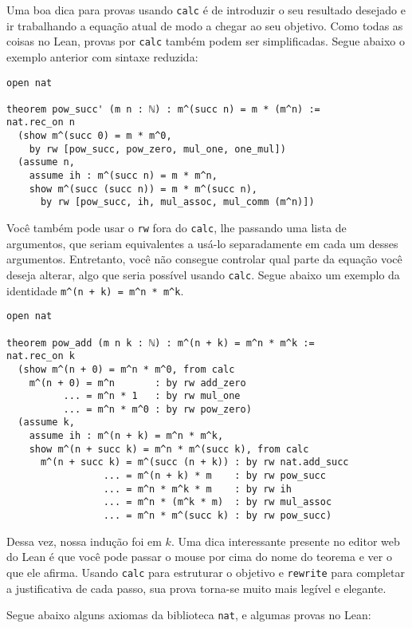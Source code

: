 Uma boa dica para provas usando \lstinline{calc} é de introduzir o seu resultado desejado e ir trabalhando a equação atual de modo a chegar ao seu objetivo. Como todas as coisas no Lean, provas por \lstinline{calc} também podem ser simplificadas. Segue abaixo o exemplo anterior com sintaxe reduzida:

\begin{lstlisting}
open nat

theorem pow_succ' (m n : ℕ) : m^(succ n) = m * (m^n) :=
nat.rec_on n
  (show m^(succ 0) = m * m^0,
    by rw [pow_succ, pow_zero, mul_one, one_mul])
  (assume n,
    assume ih : m^(succ n) = m * m^n,
    show m^(succ (succ n)) = m * m^(succ n),
      by rw [pow_succ, ih, mul_assoc, mul_comm (m^n)])
\end{lstlisting}

Você também pode usar o \lstinline{rw} fora do \lstinline{calc}, lhe passando uma lista de argumentos, que seriam equivalentes a usá-lo separadamente em cada um desses argumentos.
Entretanto, você não consegue controlar qual parte da equação você deseja alterar, algo que seria possível usando \lstinline{calc}. Segue abaixo um exemplo da identidade \lstinline{m^(n + k) = m^n * m^k}.

\begin{lstlisting}
open nat

theorem pow_add (m n k : ℕ) : m^(n + k) = m^n * m^k :=
nat.rec_on k
  (show m^(n + 0) = m^n * m^0, from calc
    m^(n + 0) = m^n       : by rw add_zero
          ... = m^n * 1   : by rw mul_one
          ... = m^n * m^0 : by rw pow_zero)
  (assume k,
    assume ih : m^(n + k) = m^n * m^k,
    show m^(n + succ k) = m^n * m^(succ k), from calc
      m^(n + succ k) = m^(succ (n + k)) : by rw nat.add_succ
                 ... = m^(n + k) * m    : by rw pow_succ
                 ... = m^n * m^k * m    : by rw ih
                 ... = m^n * (m^k * m)  : by rw mul_assoc
                 ... = m^n * m^(succ k) : by rw pow_succ)
\end{lstlisting}

Dessa vez, nossa indução foi em $k$. Uma dica interessante presente no editor web do Lean é que você pode passar o mouse por cima do nome do teorema e ver o que ele afirma. Usando \lstinline{calc} para estruturar o objetivo e \lstinline{rewrite} para completar a justificativa de cada passo, sua prova torna-se muito mais legível e elegante.

Segue abaixo alguns axiomas da biblioteca \lstinline{nat}, e algumas provas no Lean:

